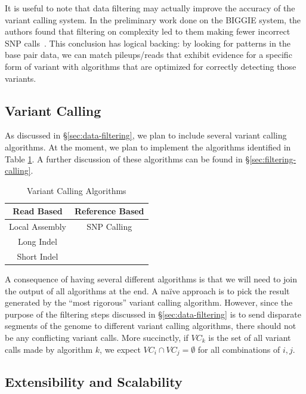 \documentclass[11pt]{article}
\begin{document}
It is useful to note that data filtering may actually improve the accuracy of the variant calling system. In the preliminary work
done on the BIGGIE system, the authors found that filtering on complexity led to them making fewer incorrect SNP
calls~\cite{xia12}. This conclusion has logical backing: by looking for patterns in the base pair data, we can match
pileups/reads that exhibit evidence for a specific form of variant with algorithms that are optimized for correctly detecting
those variants.

\subsection{Variant Calling}
\label{sec:variant-calling}

As discussed in \S\ref{sec:data-filtering}, we plan to include several variant calling algorithms. At the moment, we plan to
implement the algorithms identified in Table \ref{tab:vc-algorithms}. A further discussion of these algorithms can be found
in \S\ref{sec:filtering-calling}.

\begin{table}[h]
\begin{center}
\label{tab:vc-algorithms}
\caption{Variant Calling Algorithms}
\begin{tabular}{| c | c |}
\hline
\bf Read Based & \bf Reference Based \\
\hline \hline
Local Assembly & SNP Calling \\
Long Indel & \\
Short Indel & \\
\hline
\end{tabular}
\end{center}
\end{table}

A consequence of having several different algorithms is that we will need to join the output of all algorithms at the end.
A na\"{i}ve approach is to pick the result generated by the ``most rigorous'' variant calling algorithm. However, since the
purpose of the filtering steps discussed in \S\ref{sec:data-filtering} is to send disparate segments of the genome to
different variant calling algorithms, there should not be any conflicting variant calls. More succinctly, if $VC_{k}$ is the
set of all variant calls made by algorithm $k$, we expect $VC_{i} \cap VC_{j} = \emptyset$ for all combinations of $i, j$.

\subsection{Extensibility and Scalability}
\label{sec:extensibility-and-scalability}
\end{document}
